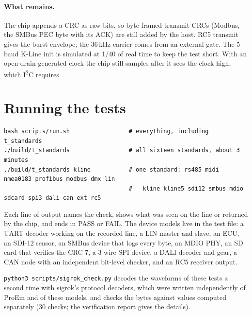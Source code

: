 \documentclass[11pt,a4paper]{article}
\newcommand{\sig}[1]{\texttt{#1}}
\begin{document}
\paragraph{What remains.} The chip appends a CRC as raw bits, so byte-framed transmit CRCs (Modbus, the SMBus PEC byte with its ACK) are still added by the host. RC5 transmit gives the burst envelope; the 36\,kHz carrier comes from an external gate. The 5-baud K-Line init is simulated at 1/40 of real time to keep the test short. With an open-drain generated clock the chip still samples after it sees the clock high, which I\textsuperscript{2}C requires.

\section{Running the tests}\label{sec:run}
\begin{lstlisting}
bash scripts/run.sh                 # everything, including t_standards
./build/t_standards                 # all sixteen standards, about 3 minutes
./build/t_standards kline           # one standard: rs485 midi nmea0183 profibus modbus dmx lin
                                    #   kline kline5 sdi12 smbus mdio sdcard spi3 dali can_ext rc5
\end{lstlisting}
Each line of output names the check, shows what was seen on the line or returned by the chip, and ends in PASS or FAIL. The device models live in the test file: a UART decoder working on the recorded line, a LIN master and slave, an ECU, an SDI-12 sensor, an SMBus device that logs every byte, an MDIO PHY, an SD card that verifies the CRC-7, a 3-wire SPI device, a DALI decoder and gear, a CAN node with an independent bit-level checker, and an RC5 receiver output.

\sig{python3 scripts/sigrok\_check.py} decodes the waveforms of these tests a second time with sigrok's protocol decoders, which were written independently of ProEm and of these models, and checks the bytes against values computed separately (30 checks; the verification report gives the details).
\end{document}
